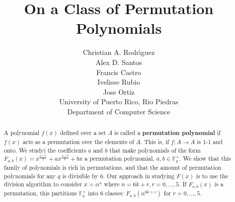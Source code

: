 \documentclass[12pt]{article}
\title{On a Class of Permutation Polynomials}
\author{Christian A. Rodr\'{\i}guez \\ Alex D. Santos \\ Francis Castro \\ Ivelisse Rubio \\ Jose Ortiz \\ University of Puerto Rico, Rio Piedras \\ Department of Computer Science}
\date{}
\begin{document}
\maketitle

\begin{abstract}

A polynomial $f(x)$ defined over a set $A$ is called a \textbf{permutation polynomial} if $f(x)$ acts as a permutation over the elements of $A$. This is, if $f: A \rightarrow A$ is 1-1 and onto. We studyi the coefficients $a$ and $b$ that make polynomials of the form $F_{a,b}(x)=x^{\frac{p+1}{2}} + ax^{\frac{p+5}{6}} + bx$ a permutation polynomial, $a,b \in \mathbb{F}_{q}^{\times}$. We show that this family of polynomials is rich in permutations, and that the amount of permutation polynomials for any $q$ is divisible by $6$. Our approach in studying $F(x)$ is to use the division algorithm to consider $x=\alpha^{n}$ where $n=6k+r, r=0,...,5$. If $F_{a,b}(x)$ is a permutation, this partitions $\mathbb{F}_{q}^{\times}$ into 6 classes: $F_{a,b}(\alpha^{6k+r})$ for $r=0,...,5$.

\end{abstract}
\end{document}
